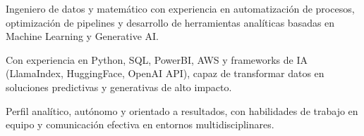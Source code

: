 







Ingeniero de datos y matemático con experiencia en automatización de procesos, optimización de pipelines y desarrollo de herramientas analíticas basadas en Machine Learning y Generative AI. 

Con experiencia en Python, SQL, PowerBI, AWS y frameworks de IA  (LlamaIndex, HuggingFace, OpenAI API), capaz de transformar datos en soluciones predictivas y generativas de alto impacto. 

Perfil analítico, autónomo y orientado a resultados, con habilidades de trabajo en equipo y comunicación efectiva en entornos multidisciplinares.